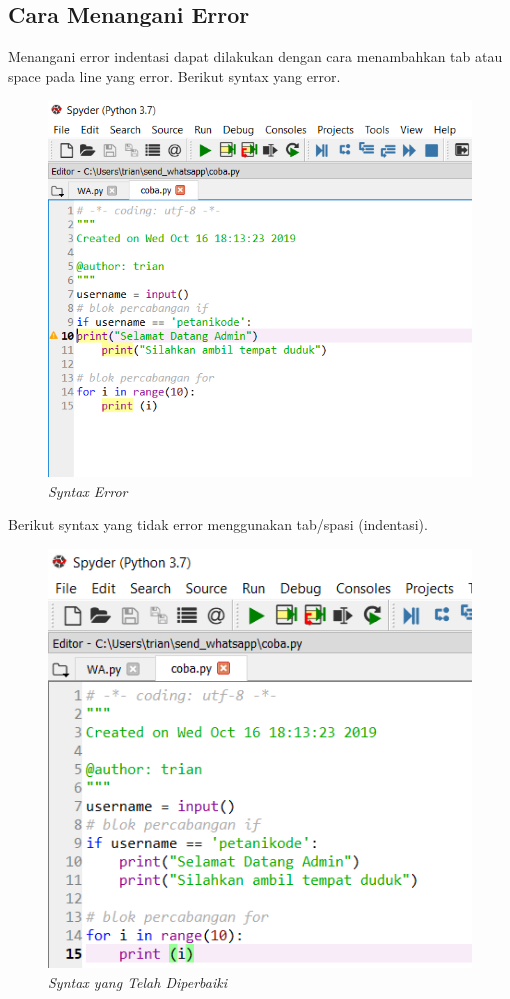 \subsection{Cara Menangani Error}
Menangani error indentasi dapat dilakukan dengan cara menambahkan tab atau space pada line yang error.
Berikut syntax yang error.
\begin{figure}[H]
    \centering
    \includegraphics[scale=0.7]{figures/indentasi}
    \caption{\textit{Syntax Error}}
    \label{Syntax Error}
\end{figure}
Berikut syntax yang tidak error menggunakan tab/spasi (indentasi).
\begin{figure}[H]
    \centering
    \includegraphics[scale=0.7]{figures/indentasicoy}
    \caption{\textit{Syntax yang Telah Diperbaiki}}
    \label{Syntax Error}
\end{figure}